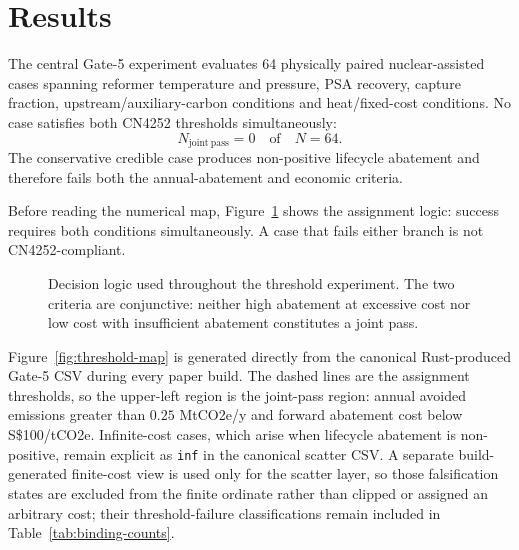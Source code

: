 \section{Results}
The central Gate-5 experiment evaluates 64 physically paired nuclear-assisted cases spanning reformer temperature and pressure, PSA recovery, capture fraction, upstream/auxiliary-carbon conditions and heat/fixed-cost conditions. No case satisfies both CN4252 thresholds simultaneously:
\begin{equation}
N_{\mathrm{joint\ pass}}=0\quad\text{of}\quad N=64.
\label{eq:joint-pass}
\end{equation}
The conservative credible case produces non-positive lifecycle abatement and therefore fails both the annual-abatement and economic criteria.


Before reading the numerical map, Figure~\ref{fig:threshold-logic} shows the assignment logic: success requires both conditions simultaneously. A case that fails either branch is not CN4252-compliant.

\begin{figure}[htbp]
\centering
{}
\caption{Decision logic used throughout the threshold experiment. The two criteria are conjunctive: neither high abatement at excessive cost nor low cost with insufficient abatement constitutes a joint pass.}
\label{fig:threshold-logic}
\end{figure}

Figure~\ref{fig:threshold-map} is generated directly from the canonical Rust-produced Gate-5 CSV during every paper build. The dashed lines are the assignment thresholds, so the upper-left region is the joint-pass region: annual avoided emissions greater than \(0.25\) MtCO2e/y and forward abatement cost below S\$100/tCO2e. Infinite-cost cases, which arise when lifecycle abatement is non-positive, remain explicit as \texttt{inf} in the canonical scatter CSV. A separate build-generated finite-cost view is used only for the scatter layer, so those falsification states are excluded from the finite ordinate rather than clipped or assigned an arbitrary cost; their threshold-failure classifications remain included in Table~\ref{tab:binding-counts}.

